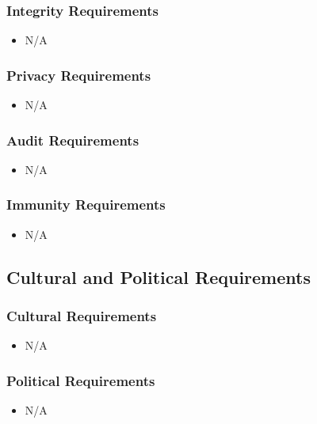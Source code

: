 \documentclass [12pt]{article}
\begin{document}
\subsubsection{Integrity Requirements }
	\begin{itemize}
		\item N/A
	\end{itemize}

\subsubsection{Privacy Requirements }
	\begin{itemize}
		\item N/A
	\end{itemize}

\subsubsection{Audit  Requirements }
	\begin{itemize}
		\item N/A
	\end{itemize} 

\subsubsection{Immunity Requirements  }
	\begin{itemize}
		\item N/A
	\end{itemize}

\subsection{Cultural and Political Requirements } 
\subsubsection{Cultural Requirements }
	\begin{itemize}
		\item N/A
	\end{itemize}

\subsubsection{Political Requirements }
	\begin{itemize}
		\item N/A
	\end{itemize}
\end{document}
